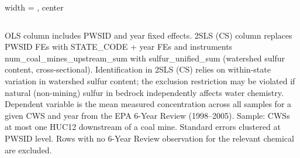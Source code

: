 \begin{table}[htbp]
\begin{adjustbox}{width = \textwidth, center}
\begin{tabular}{lcc}
         \bottomrule
         
      \end{tabular}
      
      
      
   \end{adjustbox}
      {\tiny\linespread{1}\selectfont \par \raggedright 
   OLS column includes PWSID and year fixed effects. 2SLS (CS) column replaces PWSID FEs with STATE\_CODE + year FEs and instruments num\_coal\_mines\_upstream\_sum with sulfur\_unified\_sum (watershed sulfur content, cross-sectional). Identification in 2SLS (CS) relies on within-state variation in watershed sulfur content; the exclusion restriction may be violated if natural (non-mining) sulfur in bedrock independently affects water chemistry. Dependent variable is the mean measured concentration across all samples for a given CWS and year from the EPA 6-Year Review (1998--2005). Sample: CWSs at most one HUC12 downstream of a coal mine. Standard errors clustered at PWSID level. Rows with no 6-Year Review observation for the relevant chemical are excluded.}
   
\end{table}


